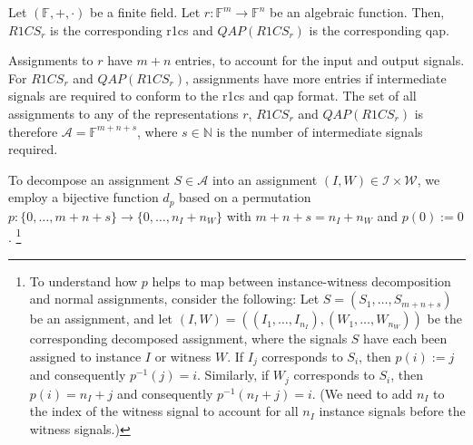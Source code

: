 \newpage
\begin{definition}
    Let $(\mathbb{F}, +, \cdot)$ be a finite field.
    Let $r:\mathbb{F}^m\to\mathbb{F}^n$ be an algebraic function.
    Then, $R1CS_r$ is the corresponding \gls{r1cs} and $QAP(R1CS_r)$ is the corresponding \gls{qap}.

    Assignments to $r$ have $m+n$ entries, to account for the input and output signals.
    For $R1CS_r$ and $QAP(R1CS_r)$, assignments have more entries if intermediate signals are required to conform to the \gls{r1cs} and \gls{qap} format.
    The set of all assignments to any of the representations $r$, $R1CS_r$ and $QAP(R1CS_r)$ is therefore $\mathcal{A}=\mathbb{F}^{m+n+s}$, where $s\in\mathbb{N}$ is the number of intermediate signals required.
    
    To decompose an assignment $S\in\mathcal{A}$ into an assignment $(I,W)\in\mathcal{I}\times\mathcal{W}$, we employ a bijective function $d_p$ based on a permutation $p:\{0,\dots, m+n+s\}\to\{0,\dots, n_I + n_W\}$ with $m+n+s=n_I+n_W$ and $p(0):=0$. \footnote{\label{footnote:decompRelationPermutation}
        To understand how $p$ helps to map between instance-witness decomposition and normal assignments, consider the following:
        Let $S=(S_1,\dots, S_{m+n+s})$ be an assignment, and let $(I,W)=((I_1,\dots, I_{n_I}), (W_1,\dots, W_{n_W}))$ be the corresponding decomposed assignment, where the signals $S$ have each been assigned to instance $I$ or witness $W$.
        If $I_j$ corresponds to $S_i$, then $p(i):=j$ and consequently $p^{-1}(j)=i$.
        Similarly, if $W_j$ corresponds to $S_i$, then $p(i)=n_I+j$ and consequently $p^{-1}(n_I+j)=i$.
        (We need to add $n_I$ to the index of the witness signal to account for all $n_I$ instance signals before the witness signals.)

}
\end{definition}
